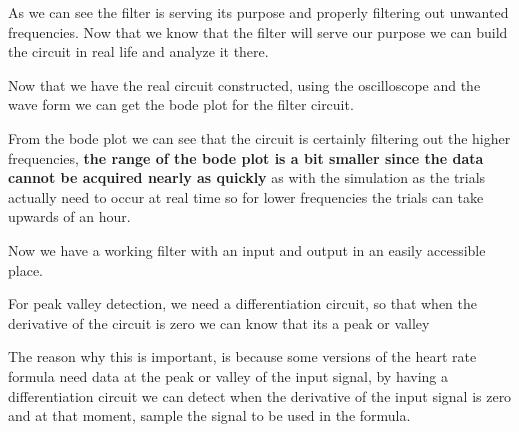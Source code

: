 \documentclass{article}
\begin{document}
As we can see the filter is serving its purpose and properly filtering out unwanted frequencies. Now that we know that the filter will serve our purpose we can build the circuit in real life and analyze it there.
\begin{center}
\end{center}
Now that we have the real circuit constructed, using the oscilloscope and the wave form we can get the bode plot for the filter circuit.

From the bode plot we can see that the circuit is certainly filtering out the higher frequencies, \textbf{the range of the bode plot is a bit smaller since the data cannot be acquired nearly as quickly} as with the simulation as the trials actually need to occur at real time so for lower frequencies the trials can take upwards of an hour.
\begin{center}
\end{center}
Now we have a working filter with an input and output in an easily accessible place.

For peak valley detection, we need a differentiation circuit, so that when the derivative of the circuit is zero we can know that its a peak or valley

The reason why this is important, is because some versions of the heart rate formula need data at the peak or valley of the input signal, by having a differentiation circuit we can detect when the derivative of the input signal is zero and at that moment, sample the signal to be used in the formula.
\end{document}
